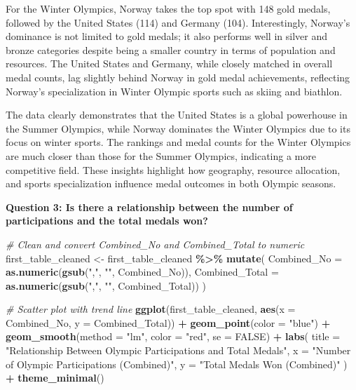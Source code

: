 \documentclass[
]{article}
\newenvironment{Shaded}{\begin{snugshade}}{\end{snugshade}}
\newcommand{\AttributeTok}[1]{\textcolor[rgb]{0.13,0.29,0.53}{#1}}
\newcommand{\CommentTok}[1]{\textcolor[rgb]{0.56,0.35,0.01}{\textit{#1}}}
\newcommand{\ConstantTok}[1]{\textcolor[rgb]{0.56,0.35,0.01}{#1}}
\newcommand{\FunctionTok}[1]{\textcolor[rgb]{0.13,0.29,0.53}{\textbf{#1}}}
\newcommand{\NormalTok}[1]{#1}
\newcommand{\OtherTok}[1]{\textcolor[rgb]{0.56,0.35,0.01}{#1}}
\newcommand{\SpecialCharTok}[1]{\textcolor[rgb]{0.81,0.36,0.00}{\textbf{#1}}}
\newcommand{\StringTok}[1]{\textcolor[rgb]{0.31,0.60,0.02}{#1}}
\begin{document}
For the Winter Olympics, Norway takes the top spot with 148 gold medals,
followed by the United States (114) and Germany (104). Interestingly,
Norway's dominance is not limited to gold medals; it also performs well
in silver and bronze categories despite being a smaller country in terms
of population and resources. The United States and Germany, while
closely matched in overall medal counts, lag slightly behind Norway in
gold medal achievements, reflecting Norway's specialization in Winter
Olympic sports such as skiing and biathlon.

The data clearly demonstrates that the United States is a global
powerhouse in the Summer Olympics, while Norway dominates the Winter
Olympics due to its focus on winter sports. The rankings and medal
counts for the Winter Olympics are much closer than those for the Summer
Olympics, indicating a more competitive field. These insights highlight
how geography, resource allocation, and sports specialization influence
medal outcomes in both Olympic seasons.

\textbf{Question 3: Is there a relationship between the number of
participations and the total medals won?}

\begin{Shaded}
\begin{Highlighting}[]
\CommentTok{\# Clean and convert Combined\_No and Combined\_Total to numeric}
\NormalTok{first\_table\_cleaned }\OtherTok{\textless{}{-}}\NormalTok{ first\_table\_cleaned }\SpecialCharTok{\%\textgreater{}\%}
  \FunctionTok{mutate}\NormalTok{(}
    \AttributeTok{Combined\_No =} \FunctionTok{as.numeric}\NormalTok{(}\FunctionTok{gsub}\NormalTok{(}\StringTok{","}\NormalTok{, }\StringTok{""}\NormalTok{, Combined\_No)), }
    \AttributeTok{Combined\_Total =} \FunctionTok{as.numeric}\NormalTok{(}\FunctionTok{gsub}\NormalTok{(}\StringTok{","}\NormalTok{, }\StringTok{""}\NormalTok{, Combined\_Total)) }
\NormalTok{  )}

\CommentTok{\# Scatter plot with trend line}
\FunctionTok{ggplot}\NormalTok{(first\_table\_cleaned, }\FunctionTok{aes}\NormalTok{(}\AttributeTok{x =}\NormalTok{ Combined\_No, }\AttributeTok{y =}\NormalTok{ Combined\_Total)) }\SpecialCharTok{+}
  \FunctionTok{geom\_point}\NormalTok{(}\AttributeTok{color =} \StringTok{"blue"}\NormalTok{) }\SpecialCharTok{+} 
  \FunctionTok{geom\_smooth}\NormalTok{(}\AttributeTok{method =} \StringTok{"lm"}\NormalTok{, }\AttributeTok{color =} \StringTok{"red"}\NormalTok{, }\AttributeTok{se =} \ConstantTok{FALSE}\NormalTok{) }\SpecialCharTok{+} 
  \FunctionTok{labs}\NormalTok{(}
    \AttributeTok{title =} \StringTok{"Relationship Between Olympic Participations and Total Medals"}\NormalTok{,}
    \AttributeTok{x =} \StringTok{"Number of Olympic Participations (Combined)"}\NormalTok{,}
    \AttributeTok{y =} \StringTok{"Total Medals Won (Combined)"}
\NormalTok{  ) }\SpecialCharTok{+}
  \FunctionTok{theme\_minimal}\NormalTok{()}
\end{Highlighting}
\end{Shaded}
\end{document}
